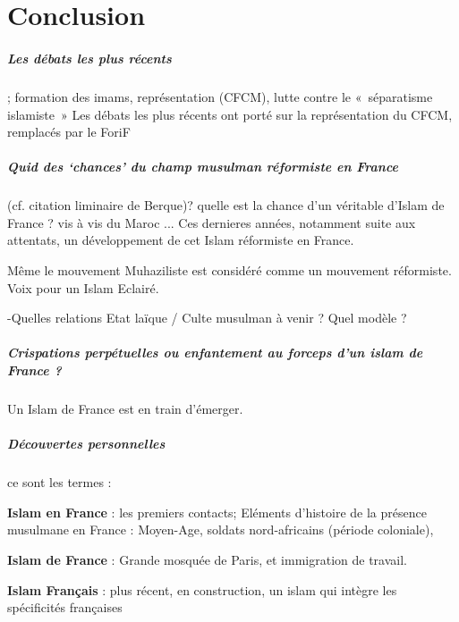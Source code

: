 \chapter{Conclusion}


\paragraph{Les débats les plus récents}; formation des imams, représentation (CFCM), lutte contre le « séparatisme islamiste » Les débats les plus récents ont porté sur la représentation du CFCM, remplacés par le ForiF 

\paragraph{Quid des ‘chances’ du champ musulman réformiste en France} (cf. citation liminaire de Berque)?
quelle est la chance d'un véritable d'Islam de France ? vis à vis du Maroc ... Ces dernieres années, notamment suite aux attentats, un développement de cet Islam réformiste en France.

Même le mouvement Muhaziliste est considéré comme un mouvement réformiste. Voix pour un Islam Eclairé. 

-Quelles relations Etat laïque / Culte musulman à venir ? Quel modèle ?

 
\paragraph{Crispations perpétuelles ou enfantement au forceps d’un islam de France ?} Un Islam de France est en train d'émerger.
 
 
 \paragraph{Découvertes personnelles}
ce sont les termes : 
\bi
\item \textbf{Islam en France} : les premiers contacts; Eléments d’histoire de la présence musulmane en France : Moyen-Age, soldats
nord-africains (période coloniale), 
\item \textbf{Islam de France} : Grande mosquée de Paris, et immigration de
travail.
\item \textbf{Islam Français} : plus récent, en construction, un islam qui intègre les spécificités françaises

